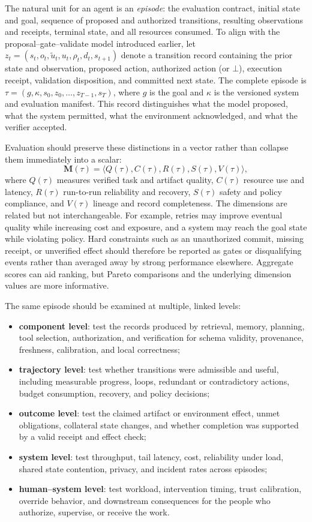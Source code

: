 The natural unit for an agent is an \emph{episode}: the evaluation contract, initial state and goal, sequence of proposed and authorized transitions, resulting observations and receipts, terminal state, and all resources consumed. To align with the proposal--gate--validate model introduced earlier, let $z_t=(s_t,o_t,\tilde{u}_t,u_t,\rho_t,d_t,s_{t+1})$ denote a transition record containing the prior state and observation, proposed action, authorized action (or $\bot$), execution receipt, validation disposition, and committed next state. The complete episode is $\tau=(g,\kappa,s_0,z_0,\ldots,z_{T-1},s_T)$, where $g$ is the goal and $\kappa$ is the versioned system and evaluation manifest. This record distinguishes what the model proposed, what the system permitted, what the environment acknowledged, and what the verifier accepted.

Evaluation should preserve these distinctions in a vector rather than collapse them immediately into a scalar:
\begin{equation}
\mathbf{M}(\tau)=\langle Q(\tau),C(\tau),R(\tau),S(\tau),V(\tau) \rangle,
\end{equation}
where $Q(\tau)$ measures verified task and artifact quality, $C(\tau)$ resource use and latency, $R(\tau)$ run-to-run reliability and recovery, $S(\tau)$ safety and policy compliance, and $V(\tau)$ lineage and record completeness. The dimensions are related but not interchangeable. For example, retries may improve eventual quality while increasing cost and exposure, and a system may reach the goal state while violating policy. Hard constraints such as an unauthorized commit, missing receipt, or unverified effect should therefore be reported as gates or disqualifying events rather than averaged away by strong performance elsewhere. Aggregate scores can aid ranking, but Pareto comparisons and the underlying dimension values are more informative.

The same episode should be examined at multiple, linked levels:
\begin{itemize}
    \item \textbf{component level}: test the records produced by retrieval, memory, planning, tool selection, authorization, and verification for schema validity, provenance, freshness, calibration, and local correctness;
    \item \textbf{trajectory level}: test whether transitions were admissible and useful, including measurable progress, loops, redundant or contradictory actions, budget consumption, recovery, and policy decisions;
    \item \textbf{outcome level}: test the claimed artifact or environment effect, unmet obligations, collateral state changes, and whether completion was supported by a valid receipt and effect check;
    \item \textbf{system level}: test throughput, tail latency, cost, reliability under load, shared state contention, privacy, and incident rates across episodes;
    \item \textbf{human--system level}: test workload, intervention timing, trust calibration, override behavior, and downstream consequences for the people who authorize, supervise, or receive the work.
\end{itemize}

